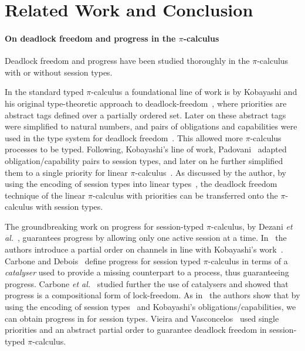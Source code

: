 \documentclass[main.tex]{subfiles}
\begin{document}
\section{Related Work and Conclusion}

\paragraph{On deadlock freedom and progress in the $\pi$-calculus}
Deadlock freedom and progress have been studied thoroughly in the $\pi$-calculus with or without session types.

In the standard typed $\pi$-calculus a foundational line of work is by Kobayashi and his original type-theoretic approach to deadlock-freedom~\cite{kobayashi98}, where priorities are abstract tags defined over a partially ordered set. Later on these abstract tags were simplified to natural numbers, and pairs of obligations and capabilities were used in the type system for deadlock freedom~\cite{kobayashi02,kobayashi06}. This allowed more $\pi$-calculus processes to be typed. Following, Kobayashi's line of work, Padovani~\cite{padovani13} adapted obligation/capability pairs to session types, and later on he further simplified them to a single priority for linear $\pi$-calculus~\cite{padovani14}. As discussed by the author, by using the encoding of session types into linear types~\cite{kobayashi07,dardhagiachino12,dardha14beat,dardha16}, the deadlock freedom technique of the linear $\pi$-calculus with priorities can be transferred onto the $\pi$-calculus with session types.

The groundbreaking work on progress for session-typed $\pi$-calculus, by Dezani \emph{et al.}~\cite{dezani-ciancaglinimostrous06}, guarantees progress by allowing only one active session at a time. In~\cite{dezani-ciancagliniliguoro09progress} the authors introduce a partial order on channels in line with Kobayashi's work~\cite{kobayashi98}. Carbone and Debois~\cite{carbonedebois10} define progress for session typed $\pi$-calculus in terms of a \emph{catalyser} used to provide a missing counterpart to a process, thus guaranteeing progress.
Carbone \emph{et al.}~\cite{carbonedardha14} studied further the use of catalysers and showed that progress is a compositional form of lock-freedom. As in~\cite{padovani14} the authors show that by using the encoding of session types~\cite{dardhagiachino12} and Kobayashi's obligations/capabilities, we can obtain progress in for session types. Vieira and Vasconcelos~\cite{vieiravasconcelos13} used single priorities and an abstract partial order to guarantee deadlock freedom in session-typed $\pi$-calculus.
\end{document}
